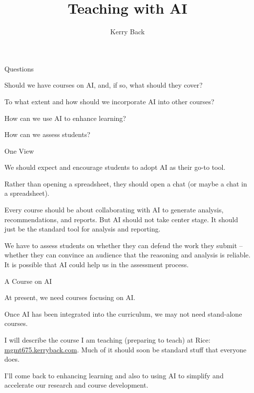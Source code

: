 \documentclass[aspectratio=169]{beamer}
\title{Teaching with AI}
\author{Kerry Back}
\date{}
\begin{document}
\maketitle

\begin{frame}{Questions}
  \begin{barenumerate}
  \item Should we have courses on AI, and, if so, what should they cover?
  \item To what extent and how should we incorporate AI into other courses?
  \item How can we use AI to enhance learning?
  \item How can we assess students?
  \end{barenumerate}

\end{frame}

\begin{frame}{One View}
  \begin{baritemize}
\item We should expect and encourage students to adopt AI as their go-to tool.

\item Rather than opening a spreadsheet, they should open a chat (or maybe a chat in a spreadsheet).

\item Every course should be about collaborating with AI to generate analysis, recommendations, and reports.  But AI should not take center stage.  It should just be the standard tool for analysis and reporting.

\item We have to assess students on whether they can defend the work they submit -- whether they can convince an audience that the reasoning and analysis is reliable.   It is possible that AI could help us in the assessment process.
  \end{baritemize}\end{frame}

\begin{frame}{A Course on AI}
\begin{baritemize}
  \item At present, we need courses focusing on AI.

\item Once AI has been integrated into the curriculum, we may not need stand-alone courses.

\item I will describe the course I am teaching (preparing to teach) at Rice: \href{https://mgmt675.kerryback.com}{mgmt675.kerryback.com}.  Much of it should soon be standard stuff that everyone does.

\item I'll come back to enhancing learning and also to using AI to simplify and accelerate our research and course development.
\end{baritemize}\end{frame}
\end{document}
